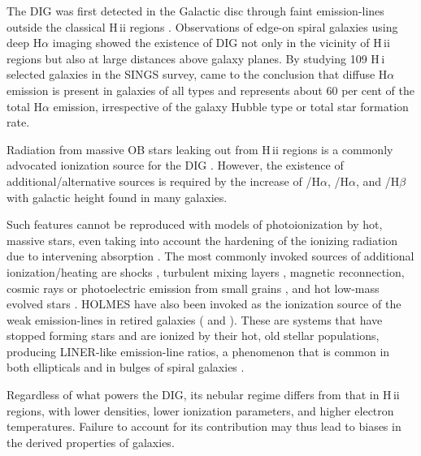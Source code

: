 \documentclass[a4paper, fleqn, usenatbib, useAMS]{mnras}
\newcommand{\Ha}{\ifmmode {\rm H}\alpha \else H$\alpha$\fi\xspace}
\newcommand{\Hb}{\ifmmode {\rm H}\beta \else H$\beta$\fi\xspace}
\newcommand{\hi}{H\,{\sc i}\xspace}
\newcommand{\hii}{H\,{\sc ii}\xspace}
\newcommand{\nii}{\ifmmode [\rm{N}\,\textsc{ii}] \else [N\,{\sc ii}]\fi\xspace}
\newcommand{\oiii}{\ifmmode [\rm{O}\,\textsc{iii}] \else [O\,{\sc iii}]\fi\xspace}
\newcommand{\sii}{\ifmmode [\rm{S}\,\textsc{ii}] \else [S\,{\sc ii}]\fi\xspace}
\begin{document}
The DIG was first detected in the Galactic disc through faint emission-lines outside the classical \hii regions \citep{Reynolds.PhD.1971}. Observations of edge-on spiral galaxies using deep \Ha imaging \citep{Dettmar.1990, HoopesWaltGreen.1996, HoopesWaltRand.1999} showed the existence of DIG not only in the vicinity of \hii regions but also at large distances above galaxy planes. By studying 109 \hi selected galaxies in the SINGS survey, \citet{Oey.etal.2007} came to the conclusion that diffuse \Ha emission is present in galaxies of all types and represents about 60 per cent of the total \Ha emission, irrespective of the galaxy Hubble type or total star formation rate.

Radiation from massive OB stars leaking out from \hii regions is a commonly advocated ionization source for the DIG \citep[see review by][]{Haffner.etal.2009}. However, the existence of additional/alternative sources is required by the increase  of \nii/\Ha, \sii/\Ha, and \oiii/\Hb with galactic height found in many galaxies.

Such features cannot be reproduced with models of photoionization by hot, massive stars, even taking into account the hardening of the ionizing radiation due to intervening absorption \citep{HoopesWalt.2003}. The most commonly invoked sources of additional ionization/heating  are shocks \citep{CollinsRand.2001}, turbulent mixing layers \citep{SlavinShullBegelman.1993, Binette.etal.2009a}, magnetic reconnection, cosmic rays or photoelectric emission from small grains \citep{Reynolds.etal.2001}, and hot low-mass evolved stars \citep[HOLMES;][]{FloresFajardo.etal.2011a}. HOLMES have also been invoked as the ionization source of the weak emission-lines in retired galaxies (\citealt{Stasinska.etal.2008a} and \citealt[hereafter CF11]{CidFernandes.etal.2011a}). These are systems that have stopped forming stars and are ionized by their hot, old stellar populations, producing LINER-like  emission-line ratios, a phenomenon that is common in both ellipticals and in bulges of spiral galaxies \citep{Sarzi.etal.2010, Gomes.etal.2016a, Belfiore.etal.2016}.

Regardless of what powers the DIG, its nebular regime differs from that in  \hii regions, with lower densities, lower ionization parameters, and higher electron temperatures. Failure to account for its contribution may thus lead to biases in the derived properties of galaxies.
\end{document}
